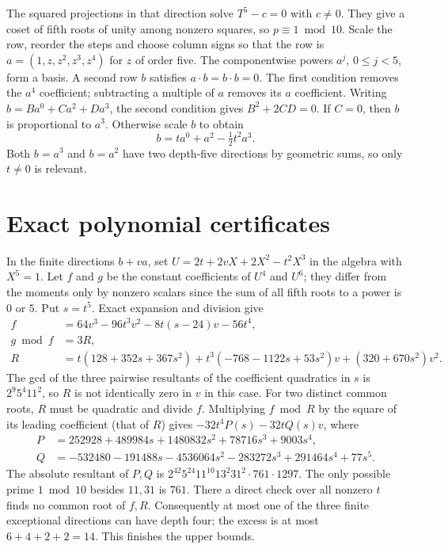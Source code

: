 \documentclass[11pt]{article}
\begin{document}
The squared projections in that direction solve $T^5-c=0$
with $c\ne0$. They give a coset of fifth roots of unity among
nonzero squares, so $p\equiv1\bmod10$.
Scale the row, reorder the steps and choose column signs so that
the row is $a=(1,z,z^2,z^3,z^4)$ for $z$ of order five.
The componentwise powers $a^j$, $0\le j<5$, form a basis.
A second row $b$ satisfies $a\cdot b=b\cdot b=0$.
The first condition removes the $a^4$ coefficient; subtracting
a multiple of $a$ removes its $a$ coefficient. Writing
$b=B a^0+C a^2+D a^3$, the second condition gives $B^2+2CD=0$.
If $C=0$, then $b$ is proportional to $a^3$. Otherwise scale
$b$ to obtain
\[
                        b=t a^0+a^2-\tfrac12t^2 a^3.
\]
Both $b=a^3$ and $b=a^2$ have two depth-five directions by
geometric sums, so only $t\ne0$ is relevant.

\section{Exact polynomial certificates}
In the finite directions $b+v a$, set
$U=2t+2vX+2X^2-t^2X^3$ in the algebra with $X^5=1$.
Let $f$ and $g$ be the constant coefficients of $U^4$ and $U^6$;
they differ from the moments only by nonzero scalars since the
sum of all fifth roots to a power is $0$ or $5$.
Put $s=t^5$. Exact expansion and division give
\[
\begin{split}
 f&=64v^3-96t^3v^2-8t(s-24)v-56t^4,\\
 g\bmod f&=3R,\\
 R&=t(128+352s+367s^2)
       +t^3(-768-1122s+53s^2)v+(320+670s^2)v^2.
\end{split}
\]
The gcd of the three pairwise resultants of the coefficient
quadratics in $s$ is $2^9 5^4 11^2$, so $R$ is not identically
zero in $v$ in this case.
For two distinct common roots, $R$ must be quadratic and divide
$f$. Multiplying $f\bmod R$ by the square of its leading
coefficient (that of $R$) gives $-32t^4P(s)-32tQ(s)v$, where
\[
\begin{aligned}
 P&=252928+489984s+1480832s^2+78716s^3+9003s^4,\\
 Q&=-532480-191488s-4536064s^2-283272s^3
                         +291464s^4+77s^5.
\end{aligned}
\]
The absolute resultant of $P,Q$ is
$2^{42}5^{24}11^{10}13^2 31^2\cdot761\cdot1297$.
The only possible prime $1\bmod10$ besides $11,31$ is $761$.
There a direct check over all nonzero $t$ finds no common root
of $f,R$. Consequently at most one of the three finite
exceptional directions can have depth four; the excess is at
most $6+4+2+2=14$. This finishes the upper bounds.
\end{document}
